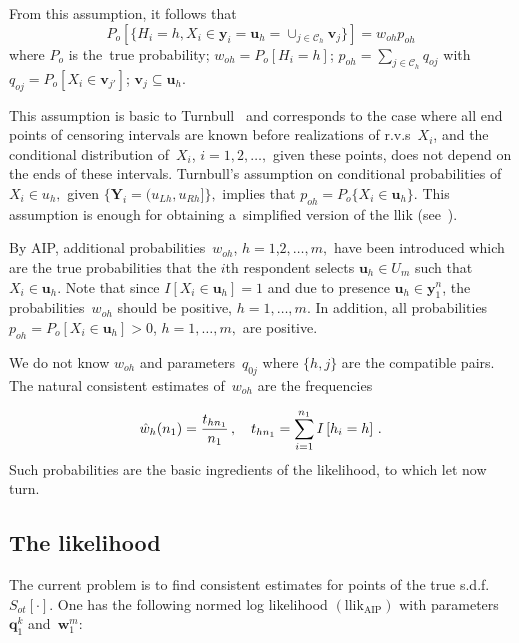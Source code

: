 \begin{multicols}{2}
  From this assumption, it follows that
  \begin{equation*}
 P_o [ \{ H_i=h, X_i \in \mathbf{y}_i =  \mathbf{u}_h =
 \cup_{j\in\mathcal{C}_h} \mathbf{v}_j\}] =   w_{oh} p_{oh}
 \end{equation*}
  where $ P_o$ is the~true probability; $w_{oh}=P_o[H_i= h]$;
$p_{oh} =\sum_{j\in\mathcal{C}_h} q_{oj}$ with
$q_{oj} =P_o [X_i \in \mathbf{v}_{j'}]$; $\mathbf{v}_j  \subseteq \mathbf{u}_h$.

  This assumption is basic to Turnbull~\cite{BK:TU74, BK:TU76} and corresponds to the case where all end points
  of censoring intervals  are known before realizations of r.v.s~$X_i$, and the conditional
  distribution of~$X_i$, $i=1, 2,\ldots,$ given these points, does not depend
   on the ends of these intervals. Turnbull's assumption
    on conditional probabilities of $ X_i \in u_h, $ given 
    $ \{ \mathbf{Y}_i=(u_{Lh},  u_{Rh}] \} ,$
    implies that $ p_{o h}=P_o\{ X_i \in \mathbf{u}_h \}$. This assumption is
    enough for obtaining a~simplified  version of the llik 
    (see~\cite{BK:GCO04}).

  By AIP,  additional
probabilities~$ w_{oh}$, $h=1$,\linebreak $2, \ldots, m,$ have been
introduced which are the true probabilities that the $i$th respondent selects
$ \mathbf{u}_h \in U_m $ such that $ X_i \in \mathbf{u}_h $. Note that since  
$ I[X_i \in \mathbf{u}_h]=1 $
and due to presence $ \mathbf{u}_h \in \mathbf{y}_1^n$,  the probabilities~$ w_{oh} $ 
should be positive, $h=1, \ldots , m.$
 In addition, all probabilities $p_{oh} =P_o [X_i \in \mathbf{u}_h ]>0$, 
 $h=1, \ldots , m,$ are positive.

We do not know $w_{oh}$ and  parameters~$q_{0j}$ where $ \{ h, j\}$
are the compatible pairs. The natural consistent estimates of~$w_{oh}$ are the
frequencies

\noindent
$$
\hat w_{h}(n_1) = \displaystyle\frac{\displaystyle t_{hn_1}\mathstrut}{\displaystyle n_1\mathstrut}\,, \quad t_{hn_1} =\sum\limits_{i=1}^{n_1} I\left[h_i=h\right]\,.
$$
Such probabilities are the basic ingredients of the likelihood, to which let now turn.

\vspace*{-9pt}

\subsection{The likelihood}

\noindent
The current problem is to find consistent estimates for
points of the true s.d.f.\  $S_{ot} [\cdot ].$
 One has the following normed log likelihood
 $(\mathrm{llik}_{\mathrm{AIP}})$  with parameters $\mathbf{q}_1^k$ and~$\mathbf{w}_1^m$:
 

\end{multicols}
